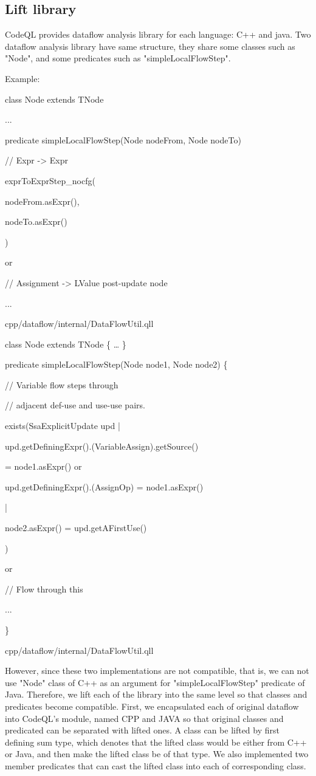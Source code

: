 \subsection{Lift library}
CodeQL provides dataflow analysis library for each language: C++ and java.
Two dataflow analysis library have same structure, they share some classes such
as "Node", and some predicates such as "simpleLocalFlowStep".

Example:

class Node extends TNode {

  ...

}

predicate simpleLocalFlowStep(Node nodeFrom, Node nodeTo) {

  // Expr -> Expr
 
  exprToExprStep\_nocfg(
  
    nodeFrom.asExpr(),
    
    nodeTo.asExpr()
  
  )
  
  or
  
  // Assignment -> LValue post-update node
  
  ...

}

cpp/dataflow/internal/DataFlowUtil.qll

class Node extends TNode \{
   …
\}

predicate simpleLocalFlowStep(Node node1, Node node2) \{

  // Variable flow steps through
  
  // adjacent def-use and use-use pairs.
  
  exists(SsaExplicitUpdate upd |
  
    upd.getDefiningExpr().(VariableAssign).getSource()
    
    = node1.asExpr() or
    
    upd.getDefiningExpr().(AssignOp) = node1.asExpr()
  
  |
  
    node2.asExpr() = upd.getAFirstUse()
  
  )
  
  or
  
  // Flow through this
  
  ...

\}

cpp/dataflow/internal/DataFlowUtil.qll

However, since these two implementations are not compatible, that is,
we can not use "Node" class of C++ as an argument for "simpleLocalFlowStep" predicate of Java.
Therefore, we lift each of the library into the same level so that classes and predicates become compatible.
First, we encapsulated each of original dataflow into CodeQL's module, named CPP and JAVA so that
original classes and predicated can be separated with lifted ones.
A class can be lifted by first defining sum type, which denotes that the lifted class would be either from C++ or
Java, and then make the lifted class be of that type. We also implemented two member predicates that can cast
the lifted class into each of corresponding class.

